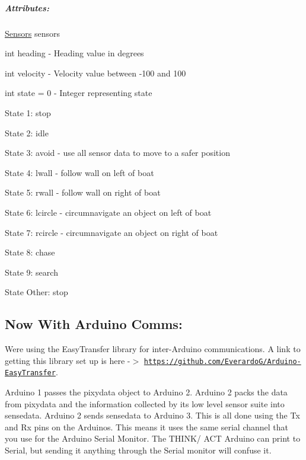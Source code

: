 \subparagraph*{Attributes\+:}


\begin{DoxyItemize}
\item {\ttfamily \hyperlink{class_sensors}{Sensors} sensors}
\item {\ttfamily int heading} -\/ Heading value in degrees
\item {\ttfamily int velocity} -\/ Velocity value between -\/100 and 100
\item {\ttfamily int state = 0} -\/ Integer representing state
\begin{DoxyItemize}
\item State 1\+: stop
\item State 2\+: idle
\item State 3\+: avoid -\/ use all sensor data to move to a safer position
\item State 4\+: lwall -\/ follow wall on left of boat
\item State 5\+: rwall -\/ follow wall on right of boat
\item State 6\+: lcircle -\/ circumnavigate an object on left of boat
\item State 7\+: rcircle -\/ circumnavigate an object on right of boat
\item State 8\+: chase
\item State 9\+: search
\item State Other\+: stop
\end{DoxyItemize}
\end{DoxyItemize}

\subsection*{Now With Arduino Comms\+:}

We\textquotesingle{}re using the Easy\+Transfer library for inter-\/\+Arduino communications. A link to getting this library set up is here -\/$>$ \href{https://github.com/EverardoG/Arduino-EasyTransfer}{\tt https\+://github.\+com/\+Everardo\+G/\+Arduino-\/\+Easy\+Transfer}.

Arduino 1 passes the {\ttfamily pixydata} object to Arduino 2. Arduino 2 packs the data from {\ttfamily pixydata} and the information collected by its low level sensor suite into {\ttfamily sensedata}. Arduino 2 sends \textquotesingle{}sensedata\textquotesingle{} to Arduino 3. This is all done using the Tx and Rx pins on the Arduinos. This means it uses the same serial channel that you use for the Arduino Serial Monitor. The T\+H\+I\+N\+K/ A\+CT Arduino can print to Serial, but sending it anything through the Serial monitor will confuse it.

